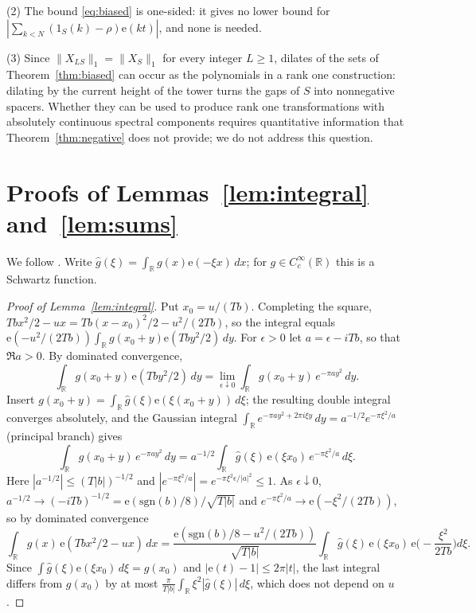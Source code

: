 \documentclass[11pt,reqno]{amsart}
\theoremstyle{definition}
\newcommand{\R}{\mathbb{R}}
\newcommand{\e}{\mathrm{e}}
\begin{document}
(2) The bound \eqref{eq:biased} is one-sided: it gives no lower bound for $|\sum_{k<N}(1_S(k)-\rho)\e(kt)|$, and none is needed.

(3) Since $\|X_{LS}\|_1=\|X_S\|_1$ for every integer $L\ge1$, dilates of the sets of Theorem~\ref{thm:biased} can occur as the polynomials in a rank one construction: dilating by the current height of the tower turns the gaps of $S$ into nonnegative spacers. Whether they can be used to produce rank one transformations with absolutely continuous spectral components requires quantitative information that Theorem~\ref{thm:negative} does not provide; we do not address this question.

\appendix
\section{Proofs of Lemmas~\ref{lem:integral} and~\ref{lem:sums}}\label{app:stationary}
We follow \cite{AMM}. Write $\widehat g(\xi)=\int_\R g(x)\e(-\xi x)\,dx$; for $g\in C_c^\infty(\R)$ this is a Schwartz function.

\begin{proof}[Proof of Lemma~\ref{lem:integral}]
Put $x_0=u/(Tb)$. Completing the square, $Tbx^2/2-ux=Tb(x-x_0)^2/2-u^2/(2Tb)$, so the integral equals $\e(-u^2/(2Tb))\int_\R g(x_0+y)\e(Tby^2/2)\,dy$. For $\epsilon>0$ let $a=\epsilon-iTb$, so that $\Re a>0$. By dominated convergence,
\[
\int_\R g(x_0+y)\,\e(Tby^2/2)\,dy=\lim_{\epsilon\downarrow0}\int_\R g(x_0+y)\,e^{-\pi a y^2}\,dy .
\]
Insert $g(x_0+y)=\int_\R\widehat g(\xi)\e(\xi(x_0+y))\,d\xi$; the resulting double integral converges absolutely, and the Gaussian integral $\int_\R e^{-\pi ay^2+2\pi i\xi y}\,dy=a^{-1/2}e^{-\pi\xi^2/a}$ (principal branch) gives
\[
\int_\R g(x_0+y)\,e^{-\pi ay^2}\,dy=a^{-1/2}\int_\R\widehat g(\xi)\,\e(\xi x_0)\,e^{-\pi\xi^2/a}\,d\xi .
\]
Here $|a^{-1/2}|\le(T|b|)^{-1/2}$ and $|e^{-\pi\xi^2/a}|=e^{-\pi\xi^2\epsilon/|a|^2}\le1$. As $\epsilon\downarrow0$, $a^{-1/2}\to(-iTb)^{-1/2}=\e(\mathrm{sgn}(b)/8)/\sqrt{T|b|}$ and $e^{-\pi\xi^2/a}\to\e(-\xi^2/(2Tb))$, so by dominated convergence
\[
\int_\R g(x)\,\e(Tbx^2/2-ux)\,dx=\frac{\e(\mathrm{sgn}(b)/8-u^2/(2Tb))}{\sqrt{T|b|}}\int_\R\widehat g(\xi)\,\e(\xi x_0)\,\e\Big(-\frac{\xi^2}{2Tb}\Big)d\xi .
\]
Since $\int\widehat g(\xi)\e(\xi x_0)\,d\xi=g(x_0)$ and $|\e(t)-1|\le2\pi|t|$, the last integral differs from $g(x_0)$ by at most $\frac\pi{T|b|}\int_\R\xi^2|\widehat g(\xi)|\,d\xi$, which does not depend on $u$.
\end{proof}
\end{document}
